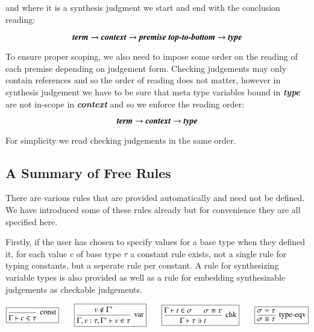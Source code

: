 and where it is a synthesis judgment we start and end with the
conclusion reading:

$$\mbox{\textbf{\emph{term}}} \to \textbf{\emph{context}} \to
\mbox{\textbf{\emph{premise top-to-bottom}}} \to
\mbox{\textbf{\emph{type}}}$$ 

To ensure proper scoping, we also need to impose some order on the reading of
each premise depending on judgement form. Checking judgements may only
contain references and so the order of reading does not matter,
however in synthesis judgement we have to be sure that meta type
variables bound in \textbf{\emph{type}} are not in-scope in
\textbf{\emph{context}} and so we enforce the reading order:

$$\mbox{\textbf{\emph{term}}} \to \mbox{\textbf{\emph{context}}} \to \mbox{\textbf{\emph{type}}}$$

For simplicity we read checking judgements in the same order.

\subsection{A Summary of Free Rules}

There are various rules that are provided automatically and need not
be defined. We have introduced some of these rules already but for
convenience they are all specified here.

Firstly, if the user has chosen to specify values for a base type when
they defined it, for each value $c$ of base type $\tau$ a constant
rule exists, not a single rule for typing constants, but a seperate
rule per constant. A rule for synthesizing variable types is also
provided as well as a rule for embedding synthesizable judgements as
checkable judgements.

$$
\boxed{
\mbox{\begin {prooftree}
  \infer0[const]{\Gamma \vdash c \in \tau}
\end {prooftree}}
}
\qquad
\boxed{
  \mbox{\begin {prooftree}
  \hypo{v \notin \Gamma '}    
  \infer1[var]{\Gamma , v : \tau , \Gamma ' \vdash v \in \tau}
  \end {prooftree}}
}
\qquad
\boxed{
  \mbox{\begin {prooftree}
  \hypo{\Gamma \vdash t \in \sigma}
  \hypo{\sigma \equiv \tau}
  \infer2[chk]{\Gamma \vdash \tau \ni t}
\end {prooftree}}  
}
\qquad
\boxed{
  \mbox{\begin {prooftree}
  \hypo{\sigma = \tau}
  \infer1[type-eqv]{\sigma \equiv \tau}
\end {prooftree}}  
}
$$

